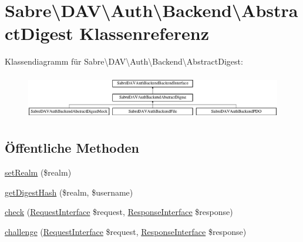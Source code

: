 \hypertarget{class_sabre_1_1_d_a_v_1_1_auth_1_1_backend_1_1_abstract_digest}{}\section{Sabre\textbackslash{}D\+AV\textbackslash{}Auth\textbackslash{}Backend\textbackslash{}Abstract\+Digest Klassenreferenz}
\label{class_sabre_1_1_d_a_v_1_1_auth_1_1_backend_1_1_abstract_digest}
Klassendiagramm für Sabre\textbackslash{}D\+AV\textbackslash{}Auth\textbackslash{}Backend\textbackslash{}Abstract\+Digest\+:\begin{figure}[H]
\begin{center}
\leavevmode
\includegraphics[height=1.964912cm]{class_sabre_1_1_d_a_v_1_1_auth_1_1_backend_1_1_abstract_digest}
\end{center}
\end{figure}
\subsection*{Öffentliche Methoden}
\begin{DoxyCompactItemize}
\item 
\mbox{\hyperlink{class_sabre_1_1_d_a_v_1_1_auth_1_1_backend_1_1_abstract_digest_a6cb7e62887f1e64cfaef9832b364400a}{set\+Realm}} (\$realm)
\item 
\mbox{\hyperlink{class_sabre_1_1_d_a_v_1_1_auth_1_1_backend_1_1_abstract_digest_a5f7e333c57f02704ab7bdb19491b1e89}{get\+Digest\+Hash}} (\$realm, \$username)
\item 
\mbox{\hyperlink{class_sabre_1_1_d_a_v_1_1_auth_1_1_backend_1_1_abstract_digest_aa91ba2f6ec926db9acf706b30d1b10a2}{check}} (\mbox{\hyperlink{interface_sabre_1_1_h_t_t_p_1_1_request_interface}{Request\+Interface}} \$request, \mbox{\hyperlink{interface_sabre_1_1_h_t_t_p_1_1_response_interface}{Response\+Interface}} \$response)
\item 
\mbox{\hyperlink{class_sabre_1_1_d_a_v_1_1_auth_1_1_backend_1_1_abstract_digest_abc8dac3b8303fda87fdd485c74a40662}{challenge}} (\mbox{\hyperlink{interface_sabre_1_1_h_t_t_p_1_1_request_interface}{Request\+Interface}} \$request, \mbox{\hyperlink{interface_sabre_1_1_h_t_t_p_1_1_response_interface}{Response\+Interface}} \$response)
\end{DoxyCompactItemize}
